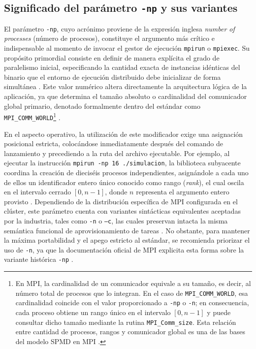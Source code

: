 \subsection{Significado del parámetro \texttt{-np} y sus variantes}

El parámetro \texttt{-np}, cuyo acrónimo proviene de la expresión inglesa \textit{number of processes} (número de procesos), constituye el argumento más crítico e indispensable al momento de invocar el gestor de ejecución \texttt{mpirun} o \texttt{mpiexec}. Su propósito primordial consiste en definir de manera explícita el grado de paralelismo inicial, especificando la cantidad exacta de instancias idénticas del binario que el entorno de ejecución distribuido debe inicializar de forma simultánea \cite{gropp_using_mpi_1999}. Este valor numérico altera directamente la arquitectura lógica de la aplicación, ya que determina el tamaño absoluto o cardinalidad del comunicador global primario, denotado formalmente dentro del estándar como \texttt{MPI\_COMM\_WORLD}\footnote{En MPI, la cardinalidad de un comunicador equivale a su tamaño, es decir, al número total de procesos que lo integran. En el caso de \texttt{MPI\_COMM\_WORLD}, esa cardinalidad coincide con el valor proporcionado a \texttt{-np} o \texttt{-n}; en consecuencia, cada proceso obtiene un rango único en el intervalo $[0, n-1]$ y puede consultar dicho tamaño mediante la rutina \texttt{MPI\_Comm\_size}. Esta relación entre cantidad de procesos, rangos y comunicador global es una de las bases del modelo SPMD en MPI \cite{mpi_forum_2025,pacheco_2011}.} \cite{mpi_forum_2025}.

En el aspecto operativo, la utilización de este modificador exige una asignación posicional estricta, colocándose inmediatamente después del comando de lanzamiento y precediendo a la ruta del archivo ejecutable. Por ejemplo, al ejecutar la instrucción \texttt{mpirun -np 16 ./simulacion}, la biblioteca subyacente coordina la creación de dieciséis procesos independientes, asignándole a cada uno de ellos un identificador entero único conocido como rango (\textit{rank}), el cual oscila en el intervalo cerrado $[0, n-1]$, donde $n$ representa el argumento entero provisto \cite{pacheco_2011}. Dependiendo de la distribución específica de MPI configurada en el clúster, este parámetro cuenta con variantes sintácticas equivalentes aceptadas por la industria, tales como \texttt{-n} o \texttt{--c}, las cuales preservan intacta la misma semántica funcional de aprovisionamiento de tareas \cite{open_mpi_2026}. No obstante, para mantener la máxima portabilidad y el apego estricto al estándar, se recomienda priorizar el uso de \texttt{-n}, ya que la documentación oficial de MPI explicita esta forma sobre la variante histórica \texttt{-np} \cite{gropp_using_mpi_1999}.

